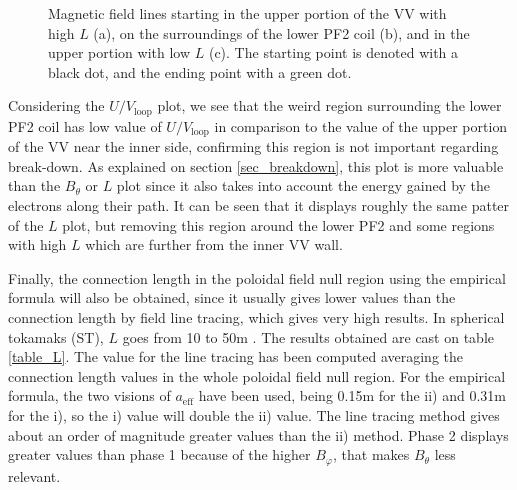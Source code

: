 \documentclass[a4paper,12pt,oneside]{book}
\begin{document}
\begin{figure}[t]
\centering
{}
\hfill
{}


\caption{Magnetic field lines starting in the upper portion of the VV with high $L$ (a), on the surroundings of the lower PF2 coil (b), and in the upper portion with low $L$ (c). The starting point is denoted with a black dot, and the ending point with a green dot.}
\label{fig_lines_int}
\end{figure}

Considering the $U/V_\text{loop}$ plot, we see that the weird region surrounding the lower PF2 coil has low value of $U/V_\text{loop}$ in comparison to the value of the upper portion of the VV near the inner side, confirming this region is not important regarding break-down. As explained on section \ref{sec_breakdown}, this plot is more valuable than the $B_\theta$ or $L$ plot since it also takes into account the energy gained by the electrons along their path. It can be seen that it displays roughly the same patter of the $L$ plot, but removing this region around the lower PF2 and some regions with high $L$ which are further from the inner VV wall.

Finally, the connection length in the poloidal field null region using the empirical formula will also be obtained, since it usually gives lower values than the connection length by field line tracing, which gives very high results. In spherical tokamaks (ST), $L$ goes from 10 to 50m \cite{VEST_2015, Globus_2001}. The results obtained are cast on table \ref{table_L}. The value for the line tracing has been computed averaging the connection length values in the whole poloidal field null region. For the empirical formula, the two visions of $a_\text{eff}$ have been used, being 0.15m for the ii) and 0.31m for the i), so the i) value will double the ii) value. The line tracing method gives about an order of magnitude greater values than the ii) method. Phase 2 displays greater values than phase 1 because of the higher $B_\varphi$, that makes $B_\theta$ less relevant.
\end{document}
